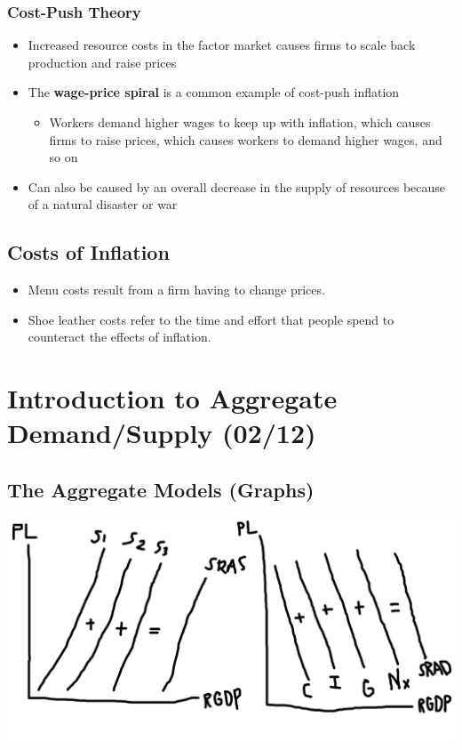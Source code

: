 \documentclass[
  letterpaper,
  DIV=11,
  numbers=noendperiod]{scrartcl}
\providecommand{\tightlist}{%
  \setlength{\itemsep}{0pt}\setlength{\parskip}{0pt}}\usepackage{longtable,booktabs,array}
\begin{document}
\subsubsection{Cost-Push Theory}\label{cost-push-theory}

\begin{itemize}
\tightlist
\item
  Increased resource costs in the factor market causes firms to scale
  back production and raise prices
\item
  The \textbf{wage-price spiral} is a common example of cost-push
  inflation

  \begin{itemize}
  \tightlist
  \item
    Workers demand higher wages to keep up with inflation, which causes
    firms to raise prices, which causes workers to demand higher wages,
    and so on
  \end{itemize}
\item
  Can also be caused by an overall decrease in the supply of resources
  because of a natural disaster or war
\end{itemize}

\subsection{Costs of Inflation}\label{costs-of-inflation}

\begin{itemize}
\tightlist
\item
  Menu costs result from a firm having to change prices.
\item
  Shoe leather costs refer to the time and effort that people spend to
  counteract the effects of inflation.
\end{itemize}

\newpage{}

\section{Introduction to Aggregate Demand/Supply
(02/12)}\label{introduction-to-aggregate-demandsupply-0212}

\subsection{The Aggregate Models
(Graphs)}\label{the-aggregate-models-graphs}

\includegraphics{img/agg-models.png}
\end{document}
